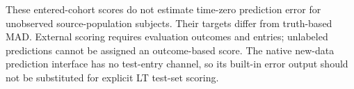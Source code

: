 These entered-cohort scores do not estimate time-zero prediction error
for unobserved source-population subjects. Their targets differ from
truth-based MAD. External scoring requires evaluation outcomes and entries;
unlabeled predictions cannot be assigned an outcome-based score. The
native new-data prediction interface has no test-entry channel, so its
built-in error output should not be substituted for explicit LT test-set
scoring.
